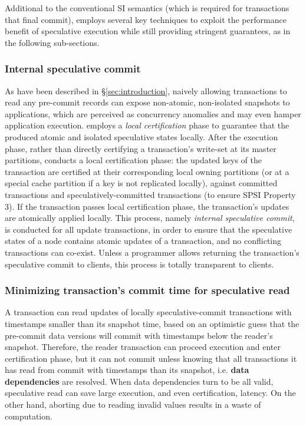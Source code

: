 Additional to the conventional SI semantics (which is required for transactions that final commit), \specula employs several key techniques to exploit the performance benefit of speculative execution while still providing stringent guarantees, as in the following sub-sections.

\subsubsection{Internal speculative commit}
\label{subsubsec:isc}
As have been described in \S \ref{sec:introduction}, naively allowing transactions to read any pre-commit records can expose non-atomic, non-isolated snapshots to applications, which are perceived as concurrency anomalies and may even hamper application execution. \specula employs a \textit{local certification} phase to guarantee that the produced atomic and isolated speculative states locally. After the execution phase, rather than directly certifying a transaction's write-set at its master partitions, \specula conducts a local certification phase: the updated keys of the transaction are certified at their corresponding local owning partitions (or at a special cache partition if a key is not replicated locally), against committed transactions and speculatively-committed transactions (to ensure SPSI Property 3). If the transaction passes local certification phase, the transaction's updates are atomically applied locally. This process, namely \textit{internal speculative commit}, is conducted for all update transactions, in order to ensure that the speculative states of a node contains atomic updates of a transaction, and no conflicting transactions can co-exist. Unless a programmer allows returning the transaction's speculative commit to clients, this process is totally transparent to clients.

\subsubsection{Minimizing transaction's commit time for speculative read}
\label{subsec:pc}
A transaction can read updates of locally speculative-commit transactions with timestamps smaller than its snapshot time, based on an optimistic guess that the pre-commit data versions will commit with timestamps below the reader's snapshot. Therefore, the reader transaction can proceed execution and enter certification phase, but it can not commit unless knowing that all transactions it has read from commit with timestamps than its snapshot, i.e. \textbf{data dependencies} are resolved. When data dependencies turn to be all valid, speculative read can save large execution, and even certification, latency. On the other hand, aborting due to reading invalid values results in a waste of computation. 


